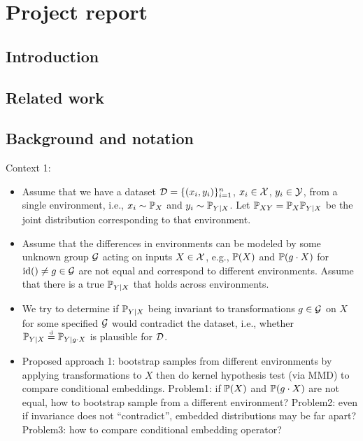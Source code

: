 

\section{Project report}

\subsection{Introduction}

\subsection{Related work}

\subsection{Background and notation}

\todo

Context 1:

\begin{itemize}

\item
Assume that we have a dataset $\mathcal{D}=\{(x_i,y_i)\}_{i=1}^n$, $x_i\in\mathcal{X}$, $y_i\in\mathcal{Y}$, from a single environment, i.e., $x_i\sim\mathbb{P}_X$ and $y_i\sim\mathbb{P}_{Y|X}$. Let $\mathbb{P}_{XY}=\mathbb{P}_X\mathbb{P}_{Y|X}$ be the joint distribution corresponding to that environment.

\item
Assume that the differences in environments can be modeled by some unknown group $\mathcal{G}$ acting on inputs $X\in\mathcal{X}$, e.g., $\mathbb{P}(X)$ and $\mathbb{P}(g\cdot X)$ for $\mathrm{id}()\neq g\in\mathcal{G}$ are not equal and correspond to different environments. Assume that there is a true $\mathbb{P}_{Y|X}$ that holds across environments.

\item
We try to determine if $\mathbb{P}_{Y|X}$ being invariant to transformations $g\in\mathcal{G}$ on $X$ for some specified $\mathcal{G}$ would contradict the dataset, i.e., whether $\mathbb{P}_{Y|X}\stackrel{\text{\rm\tiny d}}{=}\mathbb{P}_{Y|g\cdot X}$ is plausible for $\mathcal{D}$.

\item
Proposed approach 1: bootstrap samples from different environments by applying transformations to $X$ then do kernel hypothesis test (via MMD) to compare conditional embeddings. \todo Problem1: if  $\mathbb{P}(X)$ and $\mathbb{P}(g\cdot X)$ are not equal, how to bootstrap sample from a different environment? \todo Problem2: even if invariance does not ``contradict'', embedded distributions may be far apart? \todo Problem3: how to compare conditional embedding operator?

\end{itemize}

